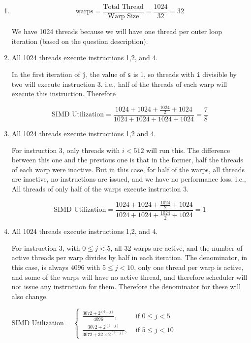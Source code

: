 \documentclass[12pt]{article}
\begin{document}
\begin{enumerate}[label=\alph*)]
	\item 
	$$\text{warps} = \frac{\text{Total Thread}}{\text{Warp Size}} = \frac{1024}{32} = 32 $$

We have 1024 threads because we will have one thread per outer loop iteration (based on the question description).


\item

All 1024 threads execute instructions 1,2, and 4.

In the first iteration of \verb+j+, the value of \Verb+s+ is $1$, so threads with \Verb+i+ divisible by two will execute instruction 3. i.e., half of the threads of each warp will execute this instruction. Therefore

$$\text{SIMD Utilization} = \frac{1024 + 1024 + \frac{1024}{2} + 1024}{1024+1024+1024+1024} = \frac{7}{8}$$

\item 
All 1024 threads execute instructions 1,2 and 4.

For instruction 3, only threads with $i<512$ will run this. The difference between this one and the previous one is that in the former, half the threads of each warp were inactive. But in this case, for half of the warps, all threads are inactive, no instructions are issued, and we have no performance loss. i.e., All threads of only half of the warps execute instruction 3.

$$\text{SIMD Utilization} = \frac{1024 + 1024 + \frac{1024}{2} + 1024}{1024+1024+\frac{1024}{2}+1024} = 1$$

\item

All 1024 threads execute instructions 1,2, and 4.

For instruction 3, with $0 \leq j <5$, all 32 warps are active, and the number of active threads per warp divides by half in each iteration. The denominator, in this case, is always $4096$ with $5 \leq j < 10$, only one thread per warp is active, and some of the warps will have no active thread, and therefore scheduler will not issue any instruction for them. Therefore the denominator for these will also change.


$\text{SIMD Utilization} = \begin{cases}\frac{3072+2^{(9-j)}}{4096}, & \text { if } 0 \leq j<5 \\ \frac{3072+2^{(9-j)}}{3072+32 \times 2^{(9-j)}}, & \text { if } 5 \leq j<10\end{cases}$



\end{enumerate}
\end{document}
